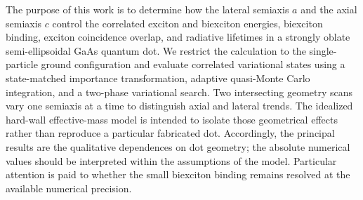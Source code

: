 The purpose of this work is to determine how the lateral semiaxis $a$ and the
axial semiaxis $c$ control the correlated exciton and biexciton energies,
biexciton binding, exciton coincidence overlap, and radiative lifetimes in a
strongly oblate semi-ellipsoidal GaAs quantum dot. We restrict the calculation
to the single-particle ground configuration and evaluate correlated
variational states using a state-matched importance transformation, adaptive
quasi-Monte Carlo integration, and a two-phase variational search. Two
intersecting geometry scans vary one semiaxis at a time to distinguish axial
and lateral trends. The idealized hard-wall effective-mass model is intended
to isolate those geometrical effects rather than reproduce a particular
fabricated dot. Accordingly, the principal results are the qualitative
dependences on dot geometry; the absolute numerical values should be
interpreted within the assumptions of the model. Particular attention is paid
to whether the small biexciton binding remains resolved at the available
numerical precision.
